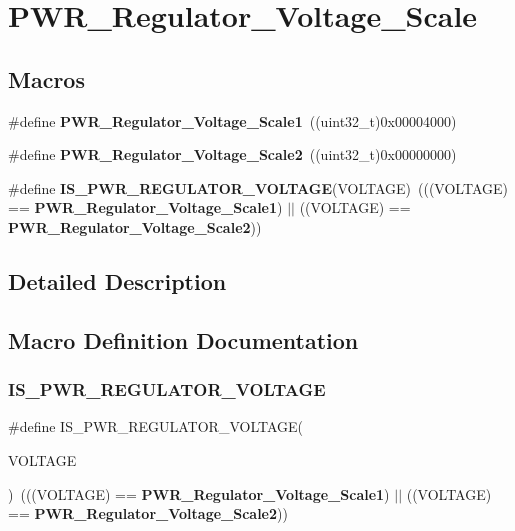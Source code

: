 \section{P\+W\+R\+\_\+\+Regulator\+\_\+\+Voltage\+\_\+\+Scale}
\label{group__PWR__Regulator__Voltage__Scale}
\subsection*{Macros}
\begin{DoxyCompactItemize}
\item 
\#define \textbf{ P\+W\+R\+\_\+\+Regulator\+\_\+\+Voltage\+\_\+\+Scale1}~((uint32\+\_\+t)0x00004000)
\item 
\#define \textbf{ P\+W\+R\+\_\+\+Regulator\+\_\+\+Voltage\+\_\+\+Scale2}~((uint32\+\_\+t)0x00000000)
\item 
\#define \textbf{ I\+S\+\_\+\+P\+W\+R\+\_\+\+R\+E\+G\+U\+L\+A\+T\+O\+R\+\_\+\+V\+O\+L\+T\+A\+GE}(V\+O\+L\+T\+A\+GE)~(((V\+O\+L\+T\+A\+GE) == \textbf{ P\+W\+R\+\_\+\+Regulator\+\_\+\+Voltage\+\_\+\+Scale1}) $\vert$$\vert$ ((V\+O\+L\+T\+A\+GE) == \textbf{ P\+W\+R\+\_\+\+Regulator\+\_\+\+Voltage\+\_\+\+Scale2}))
\end{DoxyCompactItemize}


\subsection{Detailed Description}


\subsection{Macro Definition Documentation}
\mbox{\label{group__PWR__Regulator__Voltage__Scale_gab7f9039ed34cc5af3d57606c726e66a2}} 
\subsubsection{I\+S\+\_\+\+P\+W\+R\+\_\+\+R\+E\+G\+U\+L\+A\+T\+O\+R\+\_\+\+V\+O\+L\+T\+A\+GE}
{\footnotesize\ttfamily \#define I\+S\+\_\+\+P\+W\+R\+\_\+\+R\+E\+G\+U\+L\+A\+T\+O\+R\+\_\+\+V\+O\+L\+T\+A\+GE(\begin{DoxyParamCaption}\item[{}]{V\+O\+L\+T\+A\+GE }\end{DoxyParamCaption})~(((V\+O\+L\+T\+A\+GE) == \textbf{ P\+W\+R\+\_\+\+Regulator\+\_\+\+Voltage\+\_\+\+Scale1}) $\vert$$\vert$ ((V\+O\+L\+T\+A\+GE) == \textbf{ P\+W\+R\+\_\+\+Regulator\+\_\+\+Voltage\+\_\+\+Scale2}))}



